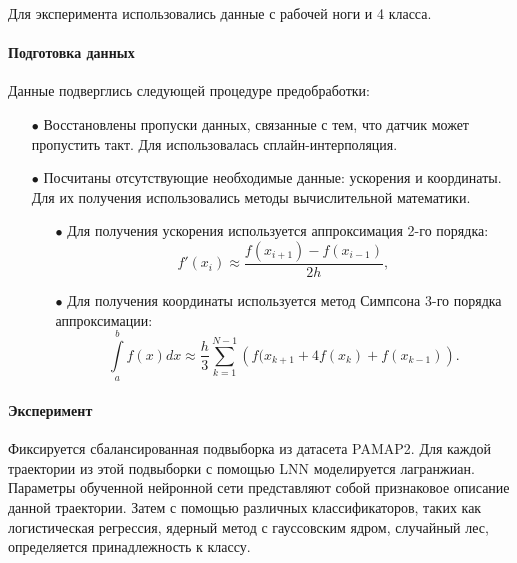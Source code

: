 \documentclass[12pt, twoside]{article}
\begin{document}
    Для эксперимента использовались данные с рабочей ноги и 4 класса.

    \paragraph{Подготовка данных \cite{processing}}

        Данные подверглись следующей процедуре предобработки:
        
        \begin{itemize}
    
            \item[$\bullet$] Восстановлены пропуски данных, связанные с тем, что датчик может пропустить такт. Для использовалась сплайн-интерполяция.

            \item[$\bullet$] Посчитаны отсутствующие необходимые данные: ускорения и координаты. Для их получения использовались методы вычислительной математики.

                \begin{itemize}

                    \item[$\bullet$] Для получения ускорения используется аппроксимация 2-го порядка:
                         $$f'(x_i) \approx \frac{f(x_{i + 1}) - f(x_{i - 1})}{2h},$$

                    \item[$\bullet$] Для получения координаты используется метод Симпсона 3-го порядка аппроксимации:
                        $$\int\limits_a^b f(x) dx \approx \frac{h}{3} \sum\limits_{k = 1}^{N - 1} \left( f(x_{k + 1} + 4f(x_k) + f(x_{k - 1}) \right).$$

                \end{itemize}

        \end{itemize}

    \paragraph{Эксперимент \cite{experiment, master-tesis}}

        Фиксируется сбалансированная подвыборка из датасета PAMAP2. Для каждой траектории из этой подвыборки с помощью LNN моделируется лагранжиан. Параметры обученной нейронной сети представляют собой признаковое описание данной траектории. Затем с помощью различных классификаторов, таких как логистическая регрессия, ядерный метод с гауссовским ядром, случайный лес, определяется принадлежность к классу.
        
\end{document}

